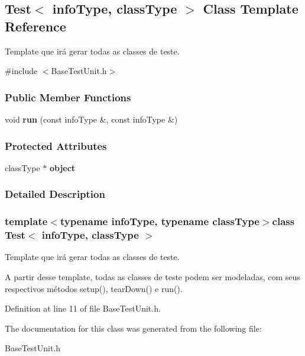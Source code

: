 \hypertarget{classTest}{\subsection{Test$<$ info\-Type, class\-Type $>$ Class Template Reference}
\label{df/da6/classTest}
}


Template que irá gerar todas as classes de teste.  




{\ttfamily \#include $<$Base\-Test\-Unit.\-h$>$}

\subsubsection*{Public Member Functions}
\begin{DoxyCompactItemize}
\item 
\hypertarget{classTest_af4efb793913e8172ec96f64dd990b777}{void {\bfseries run} (const info\-Type \&, const info\-Type \&)}\label{df/da6/classTest_af4efb793913e8172ec96f64dd990b777}

\end{DoxyCompactItemize}
\subsubsection*{Protected Attributes}
\begin{DoxyCompactItemize}
\item 
\hypertarget{classTest_ad228fd201d56aea9ebf26f7a5aefd2c1}{class\-Type $\ast$ {\bfseries object}}\label{df/da6/classTest_ad228fd201d56aea9ebf26f7a5aefd2c1}

\end{DoxyCompactItemize}


\subsubsection{Detailed Description}
\subsubsection*{template$<$typename info\-Type, typename class\-Type$>$class Test$<$ info\-Type, class\-Type $>$}

Template que irá gerar todas as classes de teste. 

A partir desse template, todas as classes de teste podem ser modeladas, com seus respectivos métodos setup(), tear\-Down() e run(). 

Definition at line 11 of file Base\-Test\-Unit.\-h.



The documentation for this class was generated from the following file\-:\begin{DoxyCompactItemize}
\item 
Base\-Test\-Unit.\-h\end{DoxyCompactItemize}
